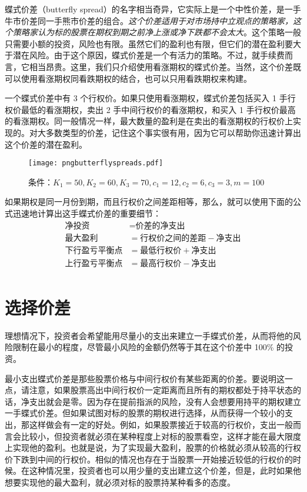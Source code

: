 \documentclass{article}
\begin{document}
蝶式价差（butterfly spread）的名字相当奇异，它实际上是一个中性价差，是一手牛市价差同一手熊市价差的组合。\textit{这个价差适用于对市场持中立观点的策略家，这个策略家认为标的股票在期权到期之前净上涨或净下跌都不会太大}。这个策略一般只需要小额的投资，风险也有限。虽然它们的盈利也有限，但它们的潜在盈利要大于潜在风险。由于这个原因，蝶式价差是一个有活力的策略。不过，就手续费而言，它相当昂贵。这里，我们只介绍使用看涨期权的蝶式价差。当然，这个价差既可以使用看涨期权同看跌期权的结合，也可以只用看跌期权来构建。

一个蝶式价差中有 3 个行权价。如果只使用看涨期权，蝶式价差包括买入 1 手行权价最低的看涨期权，卖出 2 手中间行权价的看涨期权，和买入 1 手行权价最高的看涨期权。同一般情况一样，最大数量的盈利是在卖出的看涨期权的行权价上实现的。对大多数类型的价差，记住这个事实很有用，因为它可以帮助你迅速计算出这个价差的潜在盈利。

\begin{figure}[h]
    \centering
    \texttt{[image: pngbutterflyspreads.pdf]}
    \caption{条件：$K_1=50, K_2=60, K_3=70, c_1=12, c_2=6, c_3=3, m=100$}
    \label{fig:call_spread}
\end{figure}

如果期权是同一月份到期，而且行权价之间差距相等，那么，就可以使用下面的公式迅速地计算出这手蝶式价差的重要细节：
\begin{equation}
    \begin{aligned}
    \text{净投资}&=\text{价差的净支出}\\
    \text{最大盈利}&=\text{行权价之间的差距}-\text{净支出}\\
    \text{下行盈亏平衡点}&=\text{最低行权价}+\text{净支出}\\
    \text{上行盈亏平衡点}&=\text{最高行权价}-\text{净支出}\\
    \end{aligned}
\end{equation}

\section{选择价差}
理想情况下，投资者会希望能用尽量小的支出来建立一手蝶式价差，从而将他的风险限制在最小的程度，尽管最小风险的金额仍然等于其在这个价差中 100\% 的投资。

最小支出蝶式价差是那些股票价格与中间行权价有某些距离的价差。要说明这一点，请注意，如果股票高出中间行权价一定距离而且所有的期权都处于持平状态的话，净支出就会是零。因为存在提前指派的风险，没有人会想要用持平的期权建立一手蝶式价差。但如果试图对标的股票的期权进行选择，从而获得一个较小的支出，那这样做会有一定的好处。例如，如果股票接近于较高的行权价，支出一般而言会比较小，但投资者就必须在某种程度上对标的股票看空，这样才能在最大限度上实现他的盈利。也就是说，为了实现最大盈利，股票的价格就必须从较高的行权价下跌到中间的行权价。相似的情况也存在于当股票一开始接近较低的行权价的时候。在这种情况里，投资者也可以用少量的支出建立这个价差，但是，此时如果他想要实现他的最大盈利，就必须对标的股票持某种看多的态度。
\end{document}
